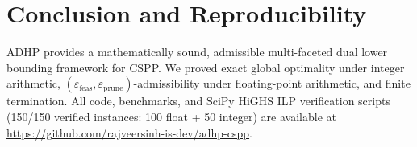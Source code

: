 \documentclass[11pt,a4paper]{article}
\begin{document}
\section{Conclusion and Reproducibility}
ADHP provides a mathematically sound, admissible multi-faceted dual lower bounding framework for CSPP. We proved exact global optimality under integer arithmetic, $(\varepsilon_{\text{feas}}, \varepsilon_{\text{prune}})$-admissibility under floating-point arithmetic, and finite termination. All code, benchmarks, and SciPy HiGHS ILP verification scripts (150/150 verified instances: 100 float + 50 integer) are available at \url{https://github.com/rajveersinh-is-dev/adhp-cspp}.



\end{document}
